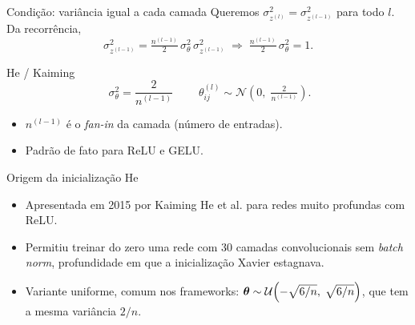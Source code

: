 \documentclass[aspectratio=169,xcolor=dvipsnames]{beamer}
\begin{document}
  \begin{frame}{Condição: variância igual a cada camada}
    Queremos $\sigma^2_{z^{(l)}} = \sigma^2_{z^{(l-1)}}$ para todo $l$. Da recorrência,
    \[
      \sigma^2_{z^{(l-1)}} = \tfrac{n^{(l-1)}}{2}\,\sigma_\theta^2\,\sigma^2_{z^{(l-1)}}
      \;\Longrightarrow\;
      \tfrac{n^{(l-1)}}{2}\,\sigma_\theta^2 = 1.
    \]
    \vfill
    \begin{block}{He / Kaiming}
      \[
        \boxed{\;\sigma_\theta^2 = \dfrac{2}{n^{(l-1)}}\;}
        \qquad
        \theta^{(l)}_{ij} \sim \mathcal{N}\!\left(0,\;\tfrac{2}{n^{(l-1)}}\right).
      \]
    \end{block}
    \begin{itemize}
      \item $n^{(l-1)}$ é o \textit{fan-in} da camada (número de entradas).
      \item Padrão de fato para ReLU e GELU.
    \end{itemize}
  \end{frame}

  \begin{frame}{Origem da inicialização He}
    \begin{itemize}
      \item Apresentada em 2015 por Kaiming He et al. para redes muito profundas com ReLU.
      \item Permitiu treinar do zero uma rede com 30 camadas convolucionais sem
        \textit{batch norm}, profundidade em que a inicialização Xavier estagnava.
      \item Variante uniforme, comum nos frameworks:
        $\bm{\theta}\sim\mathcal{U}\!\left(-\sqrt{6/n},\;\sqrt{6/n}\right)$,
        que tem a mesma variância $2/n$.
    \end{itemize}
  \end{frame}
\end{document}
